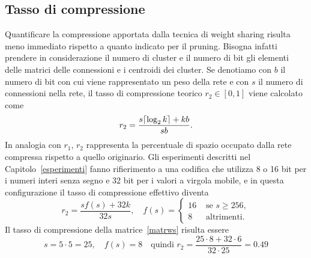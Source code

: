 \documentclass[11pt,a4paper,twoside,
openright]{book}
\DeclarePairedDelimiter{\ceil}{\lceil}{\rceil}
\begin{document}
\subsection{Tasso di compressione}
\label{sec:tassows}
Quantificare la compressione apportata dalla tecnica di weight sharing risulta meno immediato rispetto a quanto indicato per il pruning. Bisogna infatti prendere in considerazione il numero di cluster e il numero di bit
gli elementi delle matrici delle connessioni e i centroidi dei cluster. Se denotiamo con $b$ il numero di bit con cui viene rappresentato un peso della rete e con $s$ il numero di connessioni nella rete, il tasso di compressione teorico $r_2 \in [0, 1]$ viene calcolato come
\begin{equation}
r_2=\frac{s\ceil{\log_2 k}+kb}{sb}.
\label{tassowsteo}
\end{equation}
In analogia con $r_1$, $r_2$ rappresenta la percentuale di spazio occupato dalla rete compressa rispetto a quello originario.
Gli esperimenti descritti nel Capitolo~\ref{esperimenti} fanno rifierimento a una codifica che utilizza 8 o 16 bit per i numeri interi senza segno e 32 bit per i valori a virgola mobile, e in questa configurazione il tasso di compressione effettivo diventa 
\begin{equation}
r_2=\frac{s f(s) +32k}{32s}, \quad
f(s)=\begin{cases}
16 &\text{ se } s\geq256, \\
8 &\text{ altrimenti}.
\end{cases}
\label{tassows}
\end{equation}
Il tasso di compressione della matrice~\ref{matrws} risulta essere
\begin{equation}
s=5	\cdot 5 = 25, \quad
f(s)=8 \quad
\text{quindi }
r_2=\frac{25\cdot8+32\cdot6}{32\cdot25}=0.49
\label{r2esempio}
\end{equation}
\end{document}
